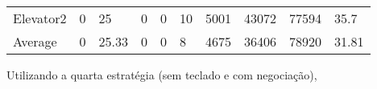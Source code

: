 ﻿\documentclass[a4paper]{article}
\begin{document}
\begin{table}[h]
\begin{tabular}{@{}llllllllll@{}}
Elevator2 & 0        & 25            & 0           & 0                                                               & 10                                                                  & 5001                                                         & 43072                                                 & 77594                                                   & 35.7         \\
Average   & 0     & 25.33         & 0        & 0                                                               & 8                                                               & 4675                                                         & 36406                                                 & 78920                                                   & 31.81          \\ \bottomrule
\end{tabular}
\end{table}

Utilizando a quarta estratégia (sem teclado e com negociação),
\end{document}
